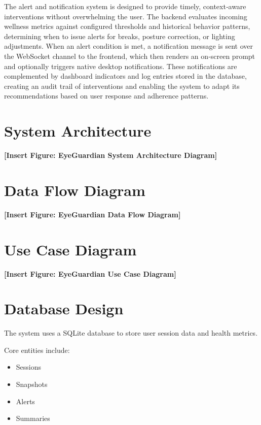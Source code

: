 \documentclass[12pt]{report}
\begin{document}
The alert and notification system is designed to provide timely, context‑aware interventions without overwhelming the user. The backend evaluates incoming wellness metrics against configured thresholds and historical behavior patterns, determining when to issue alerts for breaks, posture correction, or lighting adjustments. When an alert condition is met, a notification message is sent over the WebSocket channel to the frontend, which then renders an on‑screen prompt and optionally triggers native desktop notifications. These notifications are complemented by dashboard indicators and log entries stored in the database, creating an audit trail of interventions and enabling the system to adapt its recommendations based on user response and adherence patterns.

\section{System Architecture}

\textbf{[Insert Figure: EyeGuardian System Architecture Diagram]}

\section{Data Flow Diagram}

\textbf{[Insert Figure: EyeGuardian Data Flow Diagram]}

\section{Use Case Diagram}

\textbf{[Insert Figure: EyeGuardian Use Case Diagram]}

\section{Database Design}

The system uses a SQLite database to store user session data and health metrics.

Core entities include:

\begin{itemize}

\item Sessions
\item Snapshots
\item Alerts
\item Summaries

\end{itemize}
\end{document}
